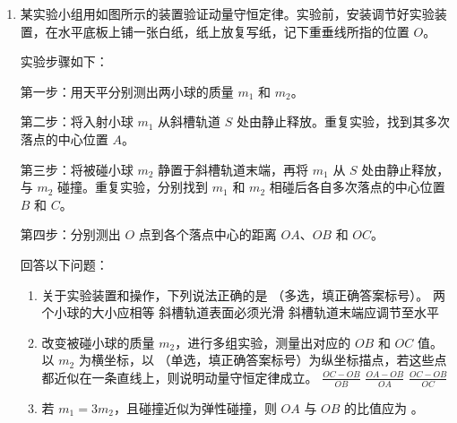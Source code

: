 \documentclass[\gkver]{gaokaozhenti}
\begin{document}
\begin{enumerate}
{C．若向右平移挡板，则 $L$ 减小，根据 $\Delta x = \frac{L}{d}\lambda$ 可知，条纹间距减小，故 C 正确；

D．若向上平移挡板，由于 $L$、$d$ 不变，根据 $\Delta x = \frac{L}{d}\lambda$ 可知，条纹间距不变，故 D 正确。

故选 ACD。
}

\item
某实验小组用如图所示的装置验证动量守恒定律。实验前，安装调节好实验装置，在水平底板上铺一张白纸，纸上放复写纸，记下重垂线所指的位置 $O$。

实验步骤如下：

第一步：用天平分别测出两小球的质量 $m_{1}$ 和 $m_{2}$。

第二步：将入射小球 $m_{1}$ 从斜槽轨道 $S$ 处由静止释放。重复实验，找到其多次落点的中心位置 $A$。

第三步：将被碰小球 $m_{2}$ 静置于斜槽轨道末端，再将 $m_{1}$ 从 $S$ 处由静止释放，与 $m_{2}$ 碰撞。重复实验，分别找到 $m_{1}$ 和 $m_{2}$ 相碰后各自多次落点的中心位置 $B$ 和 $C$。

第四步：分别测出 $O$ 点到各个落点中心的距离 $OA$、$OB$ 和 $OC$。

回答以下问题：
\begin{enumerate}
	\item
	关于实验装置和操作，下列说法正确的是 （多选，填正确答案标号）。
	{两个小球的大小应相等}
	{斜槽轨道表面必须光滑}
	{斜槽轨道末端应调节至水平}
	\item
	改变被碰小球的质量 $m_{2}$，进行多组实验，测量出对应的 $OB$ 和 $OC$ 值。以 $m_{2}$ 为横坐标，以 （单选，填正确答案标号）为纵坐标描点，若这些点都近似在一条直线上，则说明动量守恒定律成立。
	{$\frac{OC - OB}{OB}$}
	{$\frac{OA - OB}{OA}$}
	{$\frac{OC - OB}{OC}$}
	\item
	若 $m_{1} = 3m_{2}$，且碰撞近似为弹性碰撞，则 $OA$ 与 $OB$ 的比值应为 。
\end{enumerate}

\end{enumerate}
\end{document}
